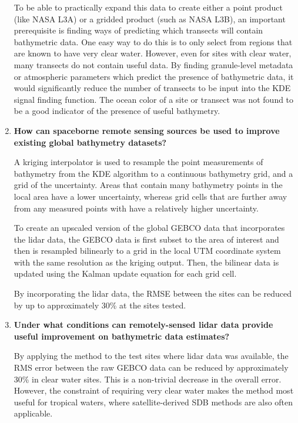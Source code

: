 \begin{enumerate}
    To be able to practically expand this data to create either a point product (like NASA L3A) or a gridded product (such as NASA L3B), an important prerequisite is finding ways of predicting which transects will contain bathymetric data. One easy way to do this is to only select from regions that are known to have very clear water. However, even for sites with clear water, many transects do not contain useful data. By finding granule-level metadata or atmospheric parameters which predict the presence of bathymetric data, it would significantly reduce the number of transects to be input into the KDE signal finding function. The ocean color of a site or transect was not found to be a good indicator of the presence of useful bathymetry.

    \item \textbf{How can spaceborne remote sensing sources be used to improve existing global bathymetry datasets?}
    
    A kriging interpolator is used to resample the point measurements of bathymetry from the KDE algorithm to a continuous bathymetry grid, and a grid of the uncertainty. Areas that contain many bathymetry points in the local area have a lower uncertainty, whereas grid cells that are further away from any measured points with have a relatively higher uncertainty.

    To create an upscaled version of the global GEBCO data that incorporates the lidar data, the GEBCO data is first subset to the area of interest and then is resampled bilinearly to a grid in the local UTM coordinate system with the same resolution as the kriging output. Then, the bilinear data is updated using the Kalman update equation for each grid cell. 

    By incorporating the lidar data, the RMSE between the sites can be reduced by up to approximately 30\% at the sites tested.
    
    \item \textbf{Under what conditions can remotely-sensed lidar data provide useful improvement on bathymetric data estimates?}
    
    By applying the method to the test sites where lidar data was available, the RMS error between the raw GEBCO data can be reduced by approximately 30\% in clear water sites. This is a non-trivial decrease in the overall error. However, the constraint of requiring very clear water makes the method most useful for tropical waters, where satellite-derived SDB methods are also often applicable. 




\end{enumerate}

